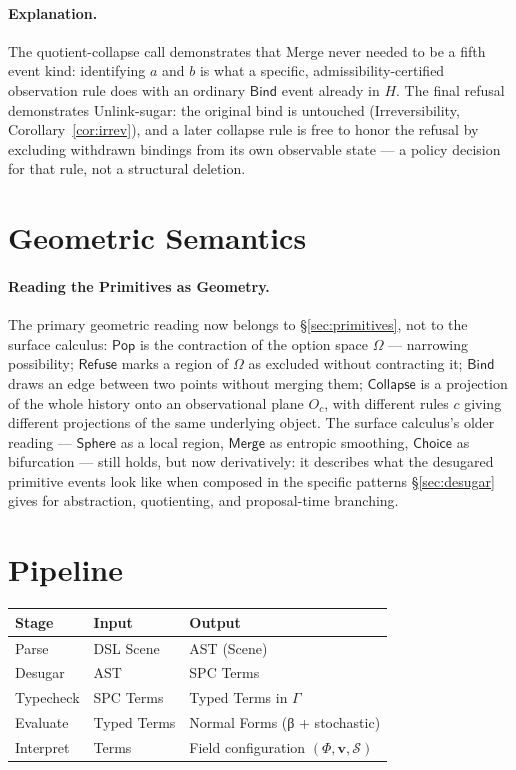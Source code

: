 \documentclass[12pt]{article}
\newcommand{\Sphere}{\mathsf{Sphere}}
\newcommand{\Pop}{\mathsf{Pop}}
\newcommand{\Merge}{\mathsf{Merge}}
\newcommand{\Choice}{\mathsf{Choice}}
\newcommand{\Ctx}{\Gamma}
\newcommand{\Entropy}{\mathcal{S}}
\newcommand{\Flow}{\mathbf{v}}
\newcommand{\Field}{\Phi}
\theoremstyle{definition}
\newcommand{\RefuseOp}{\mathsf{Refuse}}
\newcommand{\CollapseOp}{\mathsf{Collapse}}
\newcommand{\BindOp}{\mathsf{Bind}}
\begin{document}
\paragraph{Explanation.} The quotient-collapse call demonstrates that Merge never needed to be a fifth event kind: identifying $a$ and $b$ is what a specific, admissibility-certified observation rule does with an ordinary $\BindOp$ event already in $H$. The final refusal demonstrates Unlink-sugar: the original bind is untouched (Irreversibility, Corollary~\ref{cor:irrev}), and a later collapse rule is free to honor the refusal by excluding withdrawn bindings from its own observable state — a policy decision for that rule, not a structural deletion.

\section{Geometric Semantics}
\paragraph{Reading the Primitives as Geometry.}
The primary geometric reading now belongs to \S\ref{sec:primitives}, not to the surface calculus: $\Pop$ is the contraction of the option space $\Omega$ — narrowing possibility; $\RefuseOp$ marks a region of $\Omega$ as excluded without contracting it; $\BindOp$ draws an edge between two points without merging them; $\CollapseOp$ is a projection of the whole history onto an observational plane $O_c$, with different rules $c$ giving different projections of the same underlying object. The surface calculus's older reading — $\Sphere$ as a local region, $\Merge$ as entropic smoothing, $\Choice$ as bifurcation — still holds, but now derivatively: it describes what the desugared primitive events look like when composed in the specific patterns \S\ref{sec:desugar} gives for abstraction, quotienting, and proposal-time branching.

\section{Pipeline}
\begin{center}
\begin{tabular}{lll}
Stage & Input & Output\\\hline
Parse & DSL Scene & AST (Scene)\\
Desugar & AST & SPC Terms\\
Typecheck & SPC Terms & Typed Terms in $\Ctx$\\
Evaluate & Typed Terms & Normal Forms (β + stochastic)\\
Interpret & Terms & Field configuration $(\Field,\Flow,\Entropy)$\\
\end{tabular}
\end{center}
\end{document}
